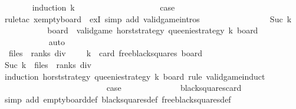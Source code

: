 \begin{isabellebody}
\ \ \ \ \ \ \isamarkupfalse%
\ {\isacharparenleft}induction\ k{\isacharparenright}\isanewline
\ \ \ \ \ \ \ \ \isamarkupfalse%
\ {}\isanewline
\ \ \ \ \ \ \ \ \isamarkupfalse%
\ {\isacharquery}case\isanewline
\ \ \ \ \ \ \ \ \ \ \isamarkupfalse%
\ {\isacharparenleft}rule{\isacharunderscore}tac\ x{\isacharequal}empty{\isacharunderscore}board\ \ exI{\isacharcomma}\ simp\ add{\isacharcolon}\ valid{\isacharunderscore}game{\isachardot}intros{\isacharparenright}\isanewline
\ \ \ \ \ \ \isamarkupfalse%
\isanewline
\ \ \ \ \ \ \ \ \isamarkupfalse%
\ {\isacharparenleft}Suc\ k{\isacharparenright}\isanewline
\ \ \ \ \ \ \ \ \isamarkupfalse%
\ \isamarkupfalse%
\ board\ \ {\isachardoublequoteopen}valid{\isacharunderscore}game\ {\isacharquery}horst{\isacharunderscore}strategy\ queenie{\isacharunderscore}strategy\ k\ board{\isachardoublequoteclose}\isanewline
\ \ \ \ \ \ \ \ \ \ \isamarkupfalse%
\ auto\isanewline
\ \ \ \ \ \ \ \ \isamarkupfalse%
\ \isamarkupfalse%
\ {\isacharasterisk}{\isacharcolon}\ {\isachardoublequoteopen}{\isacharparenleft}files\ {\isacharasterisk}\ ranks{\isacharparenright}\ div\ {}\ {\isacharminus}\ {}\ {\isacharasterisk}\ k\ {\isasymle}\ card\ {\isacharparenleft}free{\isacharunderscore}black{\isacharunderscore}squares\ board{\isacharparenright}{\isachardoublequoteclose}\isanewline
\ \ \ \ \ \ \ \ \ \ \isamarkupfalse%
\ {\isacharbackquoteopen}Suc\ k\ {\isasymle}\ {\isacharparenleft}files\ {\isacharasterisk}\ ranks{\isacharparenright}\ div\ {}{\isacharbackquoteclose}\isanewline
\ \ \ \ \ \ \ \ \isamarkupfalse%
\ {\isacharparenleft}induction\ {\isacharquery}horst{\isacharunderscore}strategy\ queenie{\isacharunderscore}strategy\ k\ board\ rule{\isacharcolon}\ valid{\isacharunderscore}game{\isachardot}induct{\isacharparenright}\isanewline
\ \ \ \ \ \ \ \ \ \ \isamarkupfalse%
\ {}\isanewline
\ \ \ \ \ \ \ \ \ \ \isamarkupfalse%
\ \isamarkupfalse%
\ {\isacharquery}case\isanewline
\ \ \ \ \ \ \ \ \ \ \ \ \isamarkupfalse%
\ black{\isacharunderscore}squares{\isacharunderscore}card\isanewline
\ \ \ \ \ \ \ \ \ \ \ \ \isamarkupfalse%
\ {\isacharparenleft}simp\ add{\isacharcolon}\ empty{\isacharunderscore}board{\isacharunderscore}def\ black{\isacharunderscore}squares{\isacharunderscore}def\ free{\isacharunderscore}black{\isacharunderscore}squares{\isacharunderscore}def{\isacharparenright}\isanewline

\end{isabellebody}
